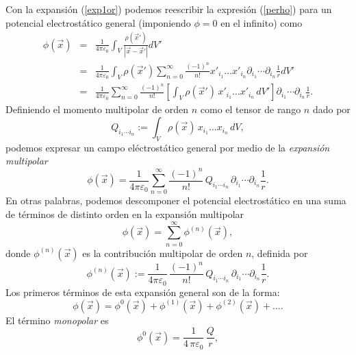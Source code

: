 Con la expansión (\ref{exp1or}) podemos reescribir la expresión
(\ref{perho}) para un potencial electrostático general (imponiendo $\phi=0$ en el infinito) como
\begin{eqnarray}
\phi(\vec x)&=&\frac{1}{4\pi\varepsilon_0}\int_V\frac{\rho(\vec x')}{
\left\vert \vec x-\vec x'\right\vert }dV'\\
&=&\frac{1}{4\pi\varepsilon_0}\int_V \rho(\vec
x')\sum_{n=0}^\infty\frac{(-1)^n}{n!}x'_{i_1}\dots x'_{i_n}\partial_{i_1}\cdots
\partial_{i_n}\frac{1}{r}dV'\\
&=&\frac{1}{4\pi\varepsilon_0}\sum_{n=0}^\infty\frac{(-1)^n}{n!}\left[\int_V
\rho(\vec x')\,x'_{i_1}\dots x'_{i_n}\,dV'\right]\partial_{i_1}\cdots
\partial_{i_n}\frac{1}{r}. \label{phimult}
\end{eqnarray}
Definiendo el momento multipolar de orden $n$ como el tensor de rango $n$ dado
por
\begin{equation}
\boxed{Q_{i_1\cdots i_n}:=\int_V \rho(\vec x)\,x_{i_1}\dots x_{i_n}\,dV,}
\end{equation}
podemos expresar un campo eléctrostático general por medio de la
\textit{expansión multipolar}
\begin{equation}
 \boxed{\phi(\vec
x)=\frac{1}{4\pi\varepsilon_0}\sum_{n=0}^\infty\frac{(-1)^n}{n!}\,Q_{ i_1\cdots
i_n}\,\partial_{i_1}\cdots\partial_{i_n}\frac{1}{r}.} \label{phimult2}
\end{equation}
En otras palabras, podemos descomponer el potencial electrostático en una suma
de términos de distinto orden en la expansión multipolar
\begin{equation}
 \boxed{\phi(\vec{x})=\sum_{n=0}^\infty\phi^{(n)}(\vec{x}),}
\end{equation}
donde $\phi^{(n)}(\vec{x})$ es la contribución multipolar de orden $n$,
definida por
\begin{equation}
\boxed{\phi^{(n)}(\vec{x}):=\frac{1}{4\pi\varepsilon_0}\,\frac{(-1)^n}{n!}\,Q_{
i_1\cdots i_n}\,\partial_{i_1}\cdots\partial_{i_n}\frac{1}{r}.}
\end{equation}
Los primeros términos de esta expansión general son de la forma:
\begin{equation} \label{eq3.2.4}
\phi(\vec{x})=\phi^0(\vec{x})+\phi^{(1)}(\vec{x})+\phi^{(2)}(\vec{x})+
\ldots.
\end{equation}
El término {\em monopolar} es
\begin{equation} \label{eq3.2.5}
\phi^0(\vec{x})=\frac{1}{4\,\pi\varepsilon_0}\,\frac{Q}{r},
\end{equation}
